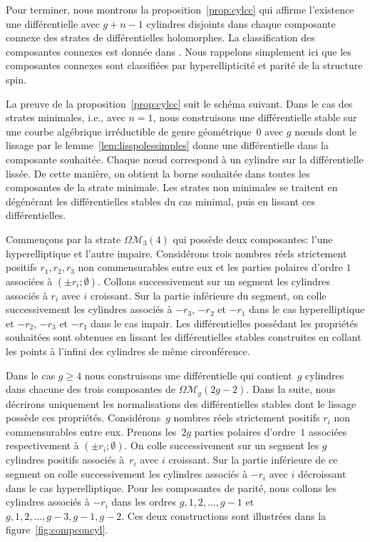 \documentclass[11pt]{article}
\newcommand{\ie}{i.e.,\xspace}
\numberwithin{equation}{section}\renewcommand{\proofname}{Démonstration}
\let\mathcal\mathscr
\newcommand{\omoduli}[1][g]{{\Omega\mathcal M}_{\!#1}}
\theoremstyle{definition}
\begin{document}
Pour terminer, nous montrons la proposition~\ref{prop:cylcc} qui affirme l'existence une différentielle avec $g+n-1$ cylindres disjoints dans chaque composante connexe des strates de différentielles holomorphes. La classification des composantes connexes est donnée dans \cite[Th.\,1\,\&\,2]{kozo}. Nous rappelons simplement ici que les composantes connexes sont classifiées par hyperellipticité et parité de la structure spin.

La preuve de la proposition~\ref{prop:cylcc} suit le schéma suivant. Dans le cas des strates minimales, \ie avec $n=1$, nous construisons une différentielle stable sur une courbe algébrique irréductible de genre géométrique~$0$ avec $g$ nœuds dont le lissage par le lemme~\ref{lem:lisspolessimples} donne une différentielle dans la composante souhaitée. Chaque nœud correspond à un cylindre sur la différentielle lissée. De cette manière, on obtient la borne souhaitée dans toutes les composantes de la strate minimale. Les strates non minimales se traitent en dégénérant les différentielles stables du cas minimal, puis en lissant ces différentielles.

Commençons par la strate $\omoduli[3](4)$ qui possède deux composantes: l'une hyper\-elliptique et l'autre impaire. Considérons trois nombres réels strictement positifs $r_{1},r_{2},r_{3}$ non commensurables entre eux et les parties polaires d'ordre $1$ associées à $(\pm r_{i};\emptyset)$. Collons successivement sur un segment les cylindres associés à $r_{i}$ avec $i$ croissant. Sur la partie inférieure du segment, on colle successivement les cylindres associés à $-r_{3}$, $-r _{2}$ et $-r_{1}$ dans le cas hyperelliptique et $-r_{2}$, $-r_{3}$ et $-r_{1}$ dans le cas impair. Les différentielles possédant les propriétés souhaitées sont obtenues en lissant les différentielles stables construites en collant les points à l'infini des cylindres de même circonférence.

Dans le cas $g\geq4$ nous construisons une différentielle qui contient~$g$ cylindres dans chacune des trois composantes de $\omoduli(2g-2)$. Dans la suite, nous décrirons uniquement les normalisations des différentielles stables dont le lissage possède ces propriétés. Considérons~$g$ nombres réels strictement positifs $r_{i}$ non commensurables entre eux. Prenons les~$2g$ parties polaires d'ordre~$1$ associées respectivement à $(\pm r_{i};\emptyset)$. On colle successivement sur un segment les $g$ cylindres positifs associés à~$r_{i}$ avec $i$ croissant. Sur la partie inférieure de ce segment on colle successivement les cylindres associés à $-r_{i}$ avec $i$ décroissant dans le cas hyperelliptique. Pour les composantes de parité, nous collons les cylindres associés à $-r_{i}$ dans les ordres $g,1,2,\dots,g-1$ et $g,1,2,\dots,g-3,g-1,g-2$. Ces deux constructions sont illustrées dans la figure~\ref{fig:compconcyl}.
\end{document}
